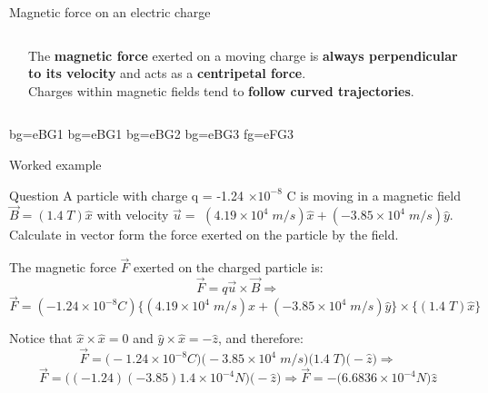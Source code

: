 \begin{frame}{Magnetic force on an electric charge}
\begin{columns}
\begin{column}{0.30\textwidth}
\begin{center}
    \end{center}
  \end{column}
  \begin{column}{0.40\textwidth}
     The {\bf magnetic force} exerted on a moving charge is
     {\bf  always perpendicular to its velocity} and acts as a {\bf centripetal force}.\\
     \vspace{0.1cm}
     Charges within magnetic fields tend to {\bf follow curved trajectories}.
  \end{column}
\end{columns}

\end{frame}



%
%

{
 {bg=eBG1}
 {bg=eBG1}
 {bg=eBG2}
 {bg=eBG3}
 {fg=eFG3}

%
%
%

\begin{frame}{Worked example}

\begin{blockexmplque}{Question}
A particle with charge q = -1.24 $\times 10^{-8}$ C is moving
in a magnetic field $\vec{B} = (1.4 \; T) \hat{x}$
with velocity $\vec{u} =$ $(4.19 \times 10^{4} \; m/s) \hat{x} + (-3.85 \times 10^{4} \; m/s) \hat{y}$.
Calculate in vector form the force exerted on the particle by the field.
\end{blockexmplque}
\vspace{0.4cm}

The magnetic force $\vec{F}$ exerted on the charged particle is:
\begin{equation*}
   \vec{F} = q \vec{u} \times \vec{B} \Rightarrow
\end{equation*}
\begin{equation*}
   \vec{F} = (-1.24 \times 10^{-8} C )
                  \Big\{ (4.19 \times 10^{4} \; m/s) \hat{x} + (-3.85 \times 10^{4} \; m/s) \hat{y} \Big\}
                  \times \Big\{(1.4 \; T) \hat{x} \Big\}
\end{equation*}

Notice that
$\hat{x} \times \hat{x} = 0$ and $\hat{y} \times \hat{x} = -\hat{z}$, and therefore:
\begin{equation*}
   \vec{F} = \Big(-1.24 \times 10^{-8} C \Big)
                  \Big(-3.85 \times 10^{4} \; m/s \Big)
                  \Big(1.4 \; T \Big) \Big(-\hat{z}\Big) \Rightarrow
\end{equation*}
\begin{equation*}
   \vec{F} = \Big( (-1.24)  (-3.85) 1.4 \times 10^{-4} N \Big) \Big(- \hat{z}\Big) \Rightarrow
   \vec{F} = - \Big( 6.6836 \times 10^{-4} N \Big)  \hat{z}
\end{equation*}

\end{frame}

} %

